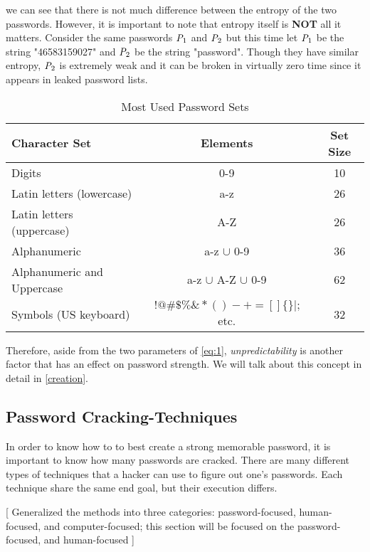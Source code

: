 \documentclass[acmsmall,nonacm]{acmart}
\begin{document}
\noindent we can see that there is not much difference between the entropy of the two passwords. However, it is important to note that entropy itself is \textbf{NOT} all it matters. Consider the same passwords $\emph{P}_1$ and $\emph{P}_2$ but this time let $\emph{P}_1$ be the string "46583159027" and $\emph{P}_2$ be the string "password". Though they have similar entropy, $\emph{P}_2$ is extremely weak and it can be broken in virtually zero time since it appears in leaked password lists.
\begin{center}
\begin{table}[ht!]

 \begin{tabular}[c]{| l  c  c |} 
\hline 
 Character Set & Elements & Set Size \\
 \hline\hline
 Digits & 0-9 & 10  \\ 
 \hline
 Latin letters (lowercase) & a-z & 26 \\
 \hline
 Latin letters (uppercase) & A-Z & 26  \\
 \hline
 Alphanumeric & a-z $\cup$  0-9 & 36  \\
 \hline
 Alphanumeric and Uppercase & a-z $\cup$ A-Z $\cup$ 0-9 & 62 \\  
 \hline
 Symbols (US keyboard) & $~!@\#\$\%\&*()-+=[]\{\}|;$ etc. & 32  \\
 \hline
 \end{tabular}
 \caption{Most Used Password Sets}
 \label{tab:sets}
\end{table}
\end{center}
Therefore, aside from the two parameters of \autoref{eq:1}, \emph{unpredictability}  is another factor that has an effect on password strength. We will talk about this concept in detail in \autoref{creation}.

\subsection{Password Cracking-Techniques}

In order to know how to to best create a strong memorable password, it is important to know how many passwords are cracked. There are many different types of techniques that a hacker can use to figure out one's passwords. Each technique share the same end goal, but their execution differs.

\textcolor{beaver}{[ Generalized the methods into three categories: password-focused, human-focused, and computer-focused; this section will be focused on the password-focused, and human-focused ]}\newline
\end{document}
